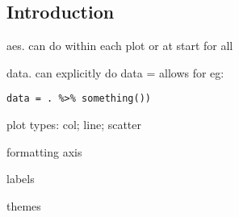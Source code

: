 
\subsection{Introduction}


aes. can do within each plot or at start for all

data. can explicitly do data = allows for eg:

\begin{verbatim}
data = . %>% something())
\end{verbatim}
plot types: col; line; scatter

formatting axis

labels

themes
